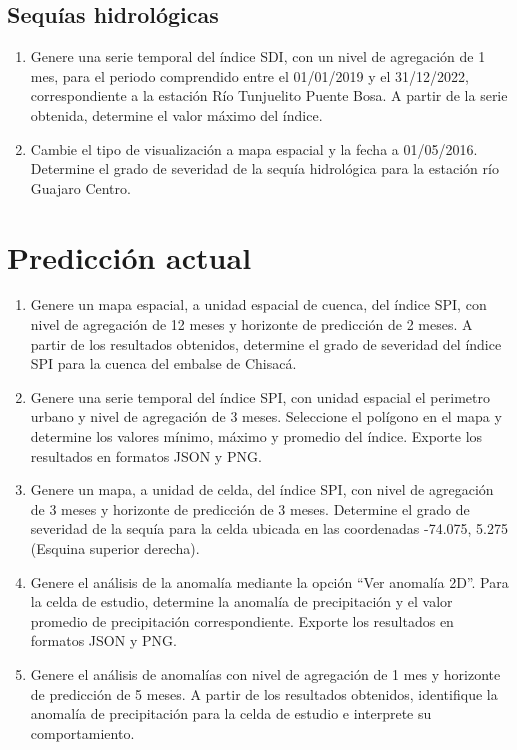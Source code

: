 \documentclass[12pt,a4paper,violet,openany]{bbe}
\begin{document}
\subsection{Sequ\'ias hidrol\'ogicas}
\begin{enumerate}[leftmargin=*,label=\alph*)]
    \item Genere una serie temporal del índice SDI, con un nivel de agregaci\'on de 1 mes, para el periodo comprendido entre el 01/01/2019 y el 31/12/2022, correspondiente a la estaci\'on R\'io Tunjuelito \textendash{} Puente Bosa. A partir de la serie obtenida, determine el valor m\'aximo del índice.
    \item Cambie el tipo de visualizaci\'on a mapa espacial y la fecha a 01/05/2016. Determine el grado de severidad de la sequ\'ia hidrol\'ogica para la estaci\'on r\'io Guajaro Centro.
\end{enumerate}

\section{Predicci\'on actual}
\begin{enumerate}[leftmargin=*,label=\alph*)]
    \item Genere un mapa espacial, a unidad espacial de cuenca, del índice SPI, con nivel de agregaci\'on de 12 meses y horizonte de predicci\'on de 2 meses. A partir de los resultados obtenidos, determine el grado de severidad del índice SPI para la cuenca del embalse de Chisac\'a.
    \item Genere una serie temporal del índice SPI, con unidad espacial el perimetro urbano y nivel de agregaci\'on de 3 meses. Seleccione el pol\'igono en el mapa y determine los valores m\'inimo, m\'aximo y promedio del índice. Exporte los resultados en formatos JSON y PNG.
    \item Genere un mapa, a unidad de celda, del índice SPI, con nivel de agregaci\'on de 3 meses y horizonte de predicci\'on de 3 meses. Determine el grado de severidad de la sequ\'ia para la celda ubicada en las coordenadas -74.075, 5.275 (Esquina superior derecha).
    \item Genere el análisis de la anomal\'ia mediante la opci\'on \textquotedblleft Ver anomal\'ia 2D\textquotedblright. Para la celda de estudio, determine la anomal\'ia de precipitaci\'on y el valor promedio de precipitaci\'on correspondiente. Exporte los resultados en formatos JSON y PNG.
    \item Genere el análisis de anomal\'ias con nivel de agregaci\'on de 1 mes y  horizonte de predicci\'on de 5 meses. A partir de los resultados obtenidos, identifique la anomal\'ia de precipitaci\'on para la celda de estudio e interprete su comportamiento.
\end{enumerate}
\end{document}
